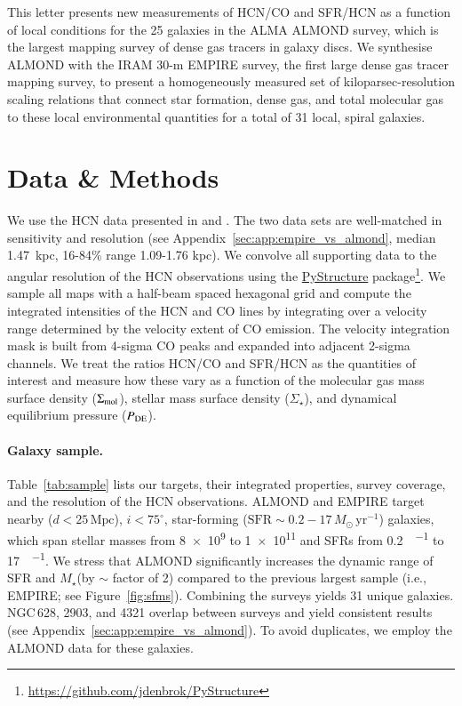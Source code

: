 \documentclass[letter, longauth]{aa} %
\newcommand*{\mstar}{\ensuremath{M_{\star}}\xspace}  %
\begin{document}
This letter presents new measurements of HCN/CO and SFR/HCN as a function of local conditions for the 25 galaxies in the ALMA ALMOND survey, which is the largest mapping survey of dense gas tracers in galaxy discs. 
We synthesise ALMOND with the IRAM 30-m EMPIRE survey, the first large dense gas tracer mapping survey, to present a homogeneously measured set of kiloparsec-resolution scaling relations that connect star formation, dense gas, and total molecular gas to these local environmental quantities for a total of 31 local, spiral galaxies. 

\section{Data \& Methods}
\label{sec:data}
We use the HCN data presented in \citet[][EMPIRE]{Jimenez-Donaire2019} and \citet[][ALMOND]{Neumann2023a}.
The two data sets are well-matched in sensitivity and resolution (see Appendix~\ref{sec:app:empire_vs_almond}, median 1.47~kpc, 16{-}84\% range 1.09{-}1.76 kpc). 
We convolve all supporting data to the angular resolution of the HCN observations using the \hyperlink{https://zenodo.org/records/13787728}{PyStructure} package\footnote{\url{https://github.com/jdenbrok/PyStructure}}. 
We sample all maps with a half-beam spaced hexagonal grid and compute the integrated intensities of the HCN and CO lines by integrating over a velocity range determined by the velocity extent of CO emission. 
The velocity integration mask is built from 4-sigma CO peaks and expanded into adjacent 2-sigma channels.
We treat the ratios HCN/CO and SFR/HCN as the quantities of interest and measure how these vary as a function of the molecular gas mass surface density ($\Sigma_{\rm mol}$), stellar mass surface density ($\Sigma_\star$), and dynamical equilibrium pressure ($P_{\rm DE}$).

\paragraph{Galaxy sample.} 

Table~\ref{tab:sample} lists our targets, their integrated properties, survey coverage, and the resolution of the HCN observations. 
ALMOND and EMPIRE target nearby ($d<25\,\mathrm{Mpc}$), $i<75^\circ$, star-forming ($\mathrm{SFR}\sim0.2-17\,M_\odot\,\mathrm{yr}^{-1}$) galaxies, which span stellar masses from \SI{8e9}{\msun} to \SI{1e11}{\msun} and SFRs from \SI{0.2}{\msun\per\year} to \SI{17}{\msun\per\year}.
We stress that ALMOND significantly increases the dynamic range of SFR and \mstar (by $\sim$ factor of 2) compared to the previous largest sample (i.e., EMPIRE; see Figure~\ref{fig:sfms}).
Combining the surveys yields 31 unique galaxies.
NGC\,628, 2903, and 4321 overlap between surveys and yield consistent results (see Appendix~\ref{sec:app:empire_vs_almond}). 
To avoid duplicates, we employ the ALMOND data for these galaxies.
\end{document}
